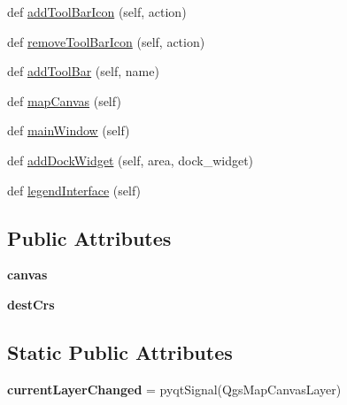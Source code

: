 \begin{DoxyCompactItemize}
\item 
def \mbox{\hyperlink{class_dsg_tools_1_1test_1_1qgis__interface_1_1_qgis_interface_a21fa39ce7214a167dec5dee19b19957a}{add\+Tool\+Bar\+Icon}} (self, action)
\item 
def \mbox{\hyperlink{class_dsg_tools_1_1test_1_1qgis__interface_1_1_qgis_interface_ae87d32f1566946c77ab0921b74cdaa07}{remove\+Tool\+Bar\+Icon}} (self, action)
\item 
def \mbox{\hyperlink{class_dsg_tools_1_1test_1_1qgis__interface_1_1_qgis_interface_a0d08264cad5a2d667de170e95c1f645d}{add\+Tool\+Bar}} (self, name)
\item 
def \mbox{\hyperlink{class_dsg_tools_1_1test_1_1qgis__interface_1_1_qgis_interface_aff8b6e067c5b1eba19ddf4d493b218cc}{map\+Canvas}} (self)
\item 
def \mbox{\hyperlink{class_dsg_tools_1_1test_1_1qgis__interface_1_1_qgis_interface_a32348515918b665617861c36f6591f23}{main\+Window}} (self)
\item 
def \mbox{\hyperlink{class_dsg_tools_1_1test_1_1qgis__interface_1_1_qgis_interface_a6351b26bacc8876ec3f10ed22953af15}{add\+Dock\+Widget}} (self, area, dock\+\_\+widget)
\item 
def \mbox{\hyperlink{class_dsg_tools_1_1test_1_1qgis__interface_1_1_qgis_interface_a2e76383e327d005f13a497fc839132fd}{legend\+Interface}} (self)
\end{DoxyCompactItemize}
\subsection*{Public Attributes}
\begin{DoxyCompactItemize}
\item 
\mbox{\label{class_dsg_tools_1_1test_1_1qgis__interface_1_1_qgis_interface_a704039c1b734f6b12ad6d4aa0e0eb249}} 
{\bfseries canvas}
\item 
\mbox{\label{class_dsg_tools_1_1test_1_1qgis__interface_1_1_qgis_interface_ad0a1e72785431c941a357f57863ced32}} 
{\bfseries dest\+Crs}
\end{DoxyCompactItemize}
\subsection*{Static Public Attributes}
\begin{DoxyCompactItemize}
\item 
\mbox{\label{class_dsg_tools_1_1test_1_1qgis__interface_1_1_qgis_interface_ac1d5509d48823595ec1828634d478f8b}} 
{\bfseries current\+Layer\+Changed} = pyqt\+Signal(Qgs\+Map\+Canvas\+Layer)
\end{DoxyCompactItemize}


